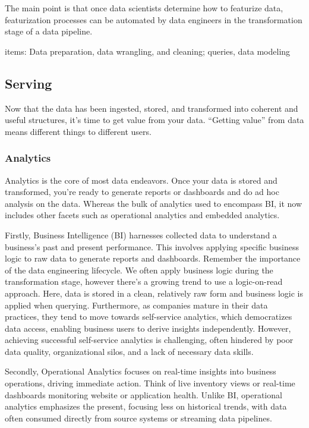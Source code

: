 \documentclass[12pt]{book}
\begin{document}
The main point is that once data
scientists determine how to featurize data, featurization processes can be
automated by data engineers in the transformation stage of a data pipeline.

items: Data preparation, data wrangling, and cleaning; queries, data modeling

\subsection{Serving}
Now that the data has been ingested, stored, and transformed into coherent and useful
structures, it’s time to get value from your data. “Getting value” from data
means different things to different users.

\subsubsection{Analytics}
Analytics is the core of most data endeavors. Once your data is stored and
transformed, you’re ready to generate reports or dashboards and do ad hoc
analysis on the data. Whereas the bulk of analytics used to encompass BI, it
now includes other facets such as operational analytics and embedded
analytics.

Firstly, Business Intelligence (BI) harnesses collected data to understand a business's past and present performance. This involves applying specific business logic to raw data to generate reports and dashboards. Remember the importance of the data engineering lifecycle. We often apply business logic during the transformation stage, however there's a growing trend to use a logic-on-read approach. Here, data is stored in a clean, relatively raw form and business logic is applied when querying. Furthermore, as companies mature in their data practices, they tend to move towards self-service analytics, which democratizes data access, enabling business users to derive insights independently. However, achieving successful self-service analytics is challenging, often hindered by poor data quality, organizational silos, and a lack of necessary data skills.

Secondly, Operational Analytics focuses on real-time insights into business operations, driving immediate action. Think of live inventory views or real-time dashboards monitoring website or application health. Unlike BI, operational analytics emphasizes the present, focusing less on historical trends, with data often consumed directly from source systems or streaming data pipelines.
\end{document}
